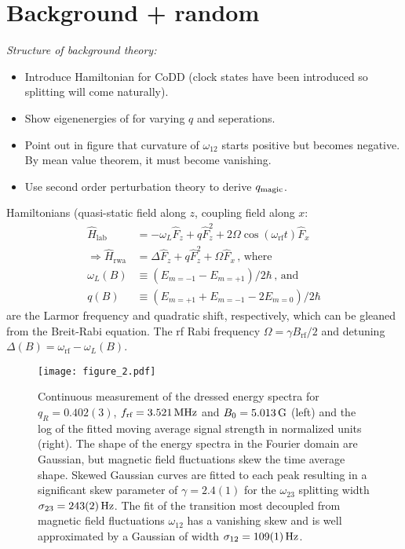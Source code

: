 \documentclass[aps,prl,reprint,superscriptaddress,floatfix]{revtex4-1}
\begin{document}
\section{Background + random}
\label{sec:background}
\textit{Structure of background theory:}
\begin{itemize}
    \item Introduce Hamiltonian for CoDD (clock states have been introduced so splitting will come naturally).
    \item Show eigenenergies of for varying $q$ and seperations.
    \item Point out in figure that curvature of $\omega_{12}$ starts positive but becomes negative.
    By mean value theorem, it must become vanishing.
    \item Use second order perturbation theory to derive $q_{\text{magic}}$.
\end{itemize}
Hamiltonians (quasi-static field along $z$, coupling field along $x$:
    \begin{align*}
        \hat{H}_{\text{lab}} &= -\omega_L \hat{F}_z + q \hat{F}_z^2 + 2\Omega \cos (\omega_{\text{rf}} t) \hat{F}_x \\
        \Rightarrow \hat{H}_{\text{rwa}} &= \Delta \hat{F}_z + q \hat{F}_z^2 + \Omega \hat{F}_x \, \text{, where} \\
        \omega_L(B) &\equiv (E_{m=-1} - E_{m=+1})/2\hbar \, \text{, and} \\
        q(B) &\equiv (E_{m=+1} + E_{m=-1} - 2 E_{m=0})/2\hbar
    \end{align*}
    are the Larmor frequency and quadratic shift, respectively, which can be gleaned from the Breit-Rabi equation.
    The rf Rabi frequency $\Omega = \gamma B_{\text{rf}}/2$ and detuning $\Delta(B) = \omega_{\text{rf}} - \omega_L(B)$.
\begin{figure}
    \centering
    \texttt{[image: figure\_2.pdf]}
    \caption{
    \label{fig:static_coupling}
    Continuous measurement of the dressed energy spectra for $q_R = 0.402(3)$, $f_{\text{rf}}=\unit[3.521]{MHz}$ and $B_0=\unit[5.013]{G}$ (left) and the log of the fitted moving average signal strength in normalized units (right). 
    The shape of the energy spectra in the Fourier domain are Gaussian, but magnetic field fluctuations skew the time average shape.  
    Skewed Gaussian curves are fitted to each peak resulting in a significant skew parameter of $\gamma = 2.4(1)$ for the $\omega_{23}$ splitting width $\sigma_{23} = \unit[243(2)]{Hz}$. 
    The fit of the transition most decoupled from magnetic field fluctuations $\omega_{12}$ has a vanishing skew and is well approximated by a Gaussian of width $\sigma_{12} = \unit[109(1)]{Hz}$.
    }
\end{figure}
\end{document}
